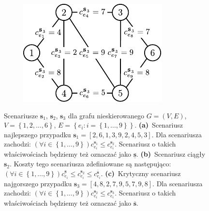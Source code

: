 \begin{figure}[!htbp]
\begin{subfigure}[b]{0.32\textwidth}
		\includegraphics[width=\textwidth]{Chapter_II/SCENARIO-example/c}
		\caption{}
		\label{fig:scenarioExample:c}
	\end{subfigure}
	\hfill\null
	\caption{
		Scenariusze $\textbf{s}_{1}$, $\textbf{s}_{2}$, $\textbf{s}_{3}$ dla grafu nieskierowanego $G = \left( V, E \right)$, $V = \left\{ 1, 2, \dots, 6 \right\}$, $E = \left\{ e_{i} : i = \left\{ 1, \dots, 9 \right\} \right\}$.
		\textbf{(a)}~Scenariusz najlepszego przypadku $\textbf{s}_{1} = \left[ 2, 6, 1, 3, 9, 2, 4, 5, 3 \right]$. Dla scenariusza zachodzi: $\left( \forall i \in \left\{ 1, \dots, 9 \right\} \right) c^{\textbf{s}_{1}}_{e_{i}} \leqslant c^{\textbf{s}_{2}}_{e_{i}}$. Scenariusz o takich właściwościach będziemy też oznaczać jako $\underline{\textbf{s}}$.
		\textbf{(b)}~Scenariusz ciągły $\textbf{s}_{2}$. Koszty tego scenariusza zdefiniowane są następująco: $\left( \forall i \in \left\{ 1, \dots, 9 \right\} \right) c^{\underline{\textbf{s}}}_{e_{i}} \leqslant c^{\textbf{s}_{2}}_{e_{i}} \leqslant c^{\overline{\textbf{s}}}_{e_{i}}$.
		\textbf{(c)}~Krytyczny scenariusz najgorszego przypadku $\textbf{s}_{3} = \left[ 4, 8, 2, 7, 9, 5, 7, 9, 8 \right]$. Dla scenariusza zachodzi: $\left( \forall i \in \left\{ 1, \dots, 9 \right\} \right) c^{\textbf{s}_{2}}_{e_{i}} \leqslant c^{\textbf{s}_{3}}_{e_{i}}$. Scenariusz o takich właściwościach będziemy też oznaczać jako $\overline{\textbf{s}}$.
	}
	\label{fig:scenarioExample}
\end{figure}

